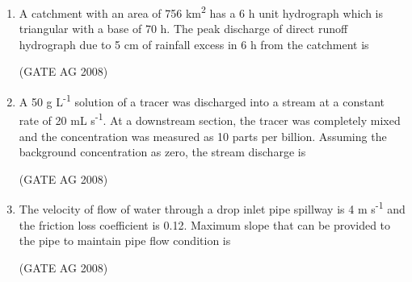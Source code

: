 \documentclass[journal,12pt,onecolumn]{IEEEtran}
\begin{document}
\begin{enumerate}
\medskip

\item 
 A catchment with an area of 756 km\textsuperscript{2} has a 6 h unit hydrograph which is triangular with a base of 70 h. The peak discharge of direct runoff hydrograph due to 5 cm of rainfall excess in 6 h from the catchment is
\begin{enumerate}
\end{enumerate}
\hfill(GATE AG 2008)\\

\medskip

\item 
 A 50 g L\textsuperscript{-1} solution of a tracer was discharged into a stream at a constant rate of 20 mL s\textsuperscript{-1}. At a downstream section, the tracer was completely mixed and the concentration was measured as 10 parts per billion. Assuming the background concentration as zero, the stream discharge is
\begin{enumerate}
\end{enumerate}
\hfill(GATE AG 2008)\\

\medskip

\item 
 The velocity of flow of water through a drop inlet pipe spillway is 4 m s\textsuperscript{-1} and the friction loss coefficient is 0.12. Maximum slope that can be provided to the pipe to maintain pipe flow condition is
\begin{enumerate}
\end{enumerate}
\hfill(GATE AG 2008)\\


\end{enumerate}
\end{document}
